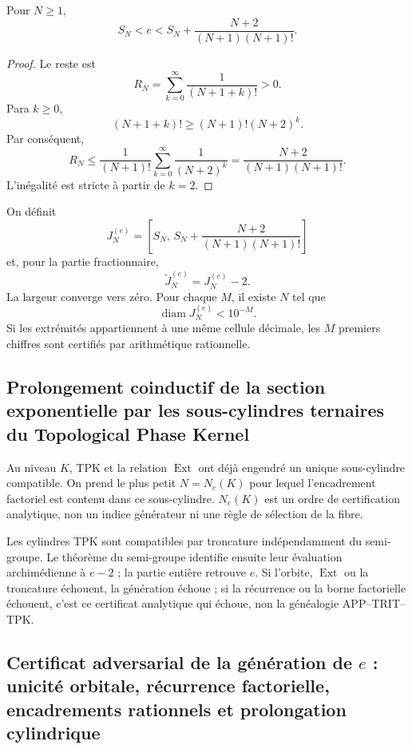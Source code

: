 \begin{theorem}
\label{p12-83-c9-s2:thm:cota-factorial-e}
Pour \(N\geq1\),
\begin{equation}
 \boxed{
 S_N<e<
 S_N+\frac{N+2}{(N+1)(N+1)!}.}
 \label{p12-83-c9-s2:eq:horquilla-factorial-e}
\end{equation}
\end{theorem}

\begin{proof}
Le reste est
\[
 R_N=\sum_{k=0}^{\infty}\frac1{(N+1+k)!}>0.
\]
Para \(k\geq0\),
\[
 (N+1+k)!
 \geq(N+1)!(N+2)^k.
\]
Par conséquent,
\[
 R_N
 \leq\frac1{(N+1)!}
 \sum_{k=0}^{\infty}\frac1{(N+2)^k}
 =\frac{N+2}{(N+1)(N+1)!}.
\]
L’inégalité est stricte à partir de \(k=2\).
\end{proof}

On définit
\[
 J_N^{(e)}=
 \left[
 S_N,\,
 S_N+\frac{N+2}{(N+1)(N+1)!}
 \right]
\]
et, pour la partie fractionnaire,
\[
 \widetilde J_N^{(e)}=J_N^{(e)}-2.
\]
La largeur converge vers zéro. Pour chaque \(M\), il existe \(N\) tel que
\[
 \operatorname{diam}J_N^{(e)}<10^{-M}.
\]
Si les extrémités appartiennent à une même cellule décimale, les \(M\) premiers
chiffres sont certifiés par arithmétique rationnelle.

\subsection{Prolongement coinductif de la section exponentielle par les sous-cylindres ternaires du Topological Phase Kernel}

Au niveau \(K\), TPK et la relation \(\operatorname{Ext}\) ont déjà engendré
un unique sous-cylindre compatible. On prend le plus petit \(N=N_e(K)\) pour lequel
l’encadrement factoriel est contenu dans ce sous-cylindre. \(N_e(K)\) est un
ordre de certification analytique, non un indice générateur ni une règle de
sélection de la fibre.

Les cylindres TPK sont compatibles par troncature indépendamment du
semi-groupe. Le théorème du semi-groupe identifie ensuite leur évaluation
archimédienne à \(e-2\) ; la partie entière retrouve \(e\). Si l’orbite,
\(\operatorname{Ext}\) ou la troncature échouent, la génération échoue ; si la
récurrence ou la borne factorielle échouent, c’est ce certificat analytique qui échoue, non la
généalogie APP--TRIT--TPK.

\subsection{Certificat adversarial de la génération de \(e\) : unicité orbitale, récurrence factorielle, encadrements rationnels et prolongation cylindrique}

